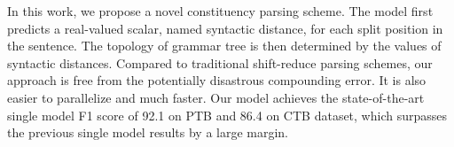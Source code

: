 In this work, we propose a novel constituency parsing scheme. The model first predicts a real-valued scalar, named syntactic distance, for each split position in the sentence. The topology of grammar tree is then determined by the values of syntactic distances. Compared to traditional shift-reduce parsing schemes, our approach is free from the potentially disastrous compounding error. It is also easier to parallelize and much faster. Our model achieves the state-of-the-art single model F1 score of 92.1 on PTB and 86.4 on CTB dataset, which surpasses the previous single model results by a large margin.
